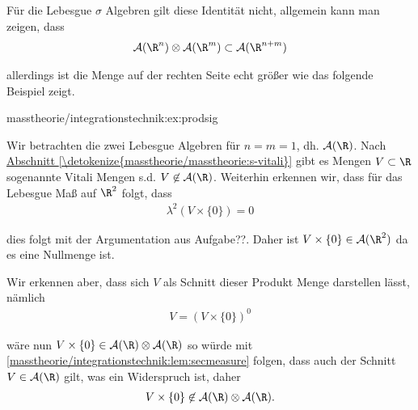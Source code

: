 \documentclass[letterpaper,10pt,german]{jupyterBook}
\begin{document}
\par
Für die Lebesgue \(\sigma\) Algebren gilt diese Identität nicht, allgemein kann man zeigen, dass
\begin{align*}
\mathcal{A}(\R^n)\otimes\mathcal{A}(\R^m)\subset \mathcal{A}(\R^{n+m})
\end{align*}
\par
allerdings ist die Menge auf der rechten Seite echt größer wie das folgende Beispiel zeigt.
\begin{example}{}{masstheorie/integrationstechnik:ex:prodsig}



\par
Wir betrachten die zwei Lebesgue Algebren für \(n=m=1\), dh. \(\mathcal{A}(\R)\). Nach \hyperref[\detokenize{masstheorie/masstheorie:s-vitali}]{Abschnitt \ref{\detokenize{masstheorie/masstheorie:s-vitali}}} gibt es Mengen \(V\subset\R\) sogenannte Vitali Mengen s.d. \(V\not\in\mathcal{A}(\R)\). Weiterhin erkennen wir, dass für das Lebesgue Maß auf \(\R^2\) folgt, dass
\begin{align*}
\lambda^{2}(V\times\{0\}) = 0
\end{align*}
\par
dies folgt mit der Argumentation aus Aufgabe??. Daher ist \(V\times\{0\}\in \mathcal{A}(\R^2)\) da es eine Nullmenge ist.

\par
Wir erkennen aber, dass sich \(V\) als Schnitt dieser Produkt Menge darstellen lässt, nämlich
\begin{align*}
V = (V\times\{0\})^0
\end{align*}
\par
wäre nun \(V\times\{0\}\in \mathcal{A}(\R)\otimes\mathcal{A}(\R)\) so würde mit \cref{masstheorie/integrationstechnik:lem:secmeasure} folgen, dass auch der Schnitt \(V\in\mathcal{A}(\R)\) gilt, was ein Widerspruch ist, daher
\begin{align*}
V\times\{0\} \not\in  \mathcal{A}(\R)\otimes\mathcal{A}(\R).
\end{align*}\end{example}
\end{document}
